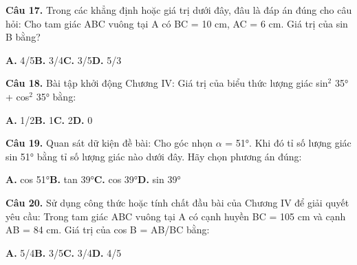 \documentclass[11pt,a4paper]{article}
\begin{document}
\textbf{\color{primary} Câu 17.} Trong các khẳng định hoặc giá trị dưới đây, đâu là đáp án đúng cho câu hỏi: Cho tam giác ABC vuông tại A có BC = 10 cm, AC = 6 cm. Giá trị của sin B bằng?\par
\hspace*{1.5em}\textbf{A.} 4/5\quad\quad \textbf{B.} 3/4\quad\quad \textbf{C.} 3/5\quad\quad \textbf{D.} 5/3\par\vspace{2pt}
\textbf{\color{primary} Câu 18.} Bài tập khởi động Chương IV: Giá trị của biểu thức lượng giác sin$^2$ 35° + cos$^2$ 35° bằng:\par
\hspace*{1.5em}\textbf{A.} 1/2\quad\quad \textbf{B.} 1\quad\quad \textbf{C.} 2\quad\quad \textbf{D.} 0\par\vspace{2pt}
\textbf{\color{primary} Câu 19.} Quan sát dữ kiện đề bài: Cho góc nhọn $\alpha$ = 51°. Khi đó tỉ số lượng giác sin 51° bằng tỉ số lượng giác nào dưới đây. Hãy chọn phương án đúng:\par
\hspace*{1.5em}\textbf{A.} cos 51°\quad\quad \textbf{B.} tan 39°\quad\quad \textbf{C.} cos 39°\quad\quad \textbf{D.} sin 39°\par\vspace{2pt}
\textbf{\color{primary} Câu 20.} Sử dụng công thức hoặc tính chất đầu bài của Chương IV để giải quyết yêu cầu: Trong tam giác ABC vuông tại A có cạnh huyền BC = 105 cm và cạnh AB = 84 cm. Giá trị của cos B = AB/BC bằng:\par
\hspace*{1.5em}\textbf{A.} 5/4\quad\quad \textbf{B.} 3/5\quad\quad \textbf{C.} 3/4\quad\quad \textbf{D.} 4/5\par\vspace{2pt}
\end{document}
